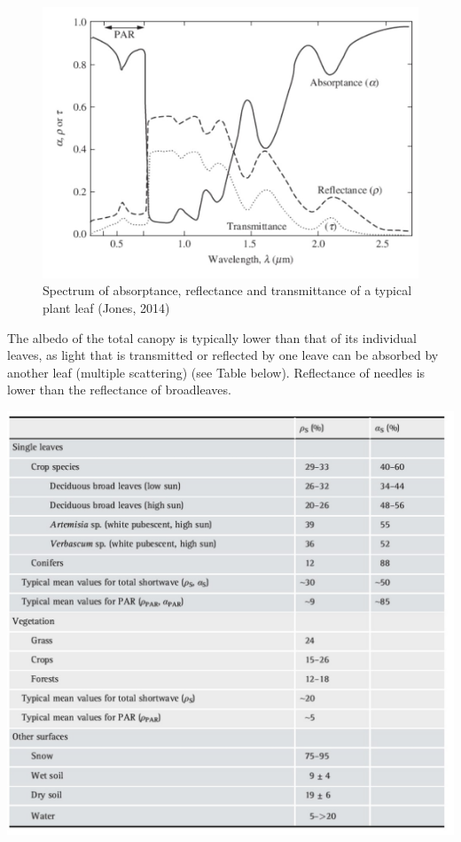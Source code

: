 \documentclass[12pt,oneside]{book}
\begin{document}
\begin{figure}

{\centering \includegraphics[width=0.8\linewidth]{figures/chap3/f37_leaf_optical} 

}

\caption{Spectrum of absorptance, reflectance and transmittance of a typical plant leaf (Jones, 2014)}\label{fig:f37b}
\end{figure}

The albedo of the total canopy is typically lower than that of its
individual leaves, as light that is transmitted or reflected by one
leave can be absorbed by another leaf (multiple scattering) (see Table
below). Reflectance of needles is lower than the reflectance of
broadleaves.

\begin{center}
\label{table:reflectance}

\begin{center}\includegraphics[width=0.8\linewidth]{figures/chap3/f38_table_optical} \end{center}
\end{center}
\end{document}
